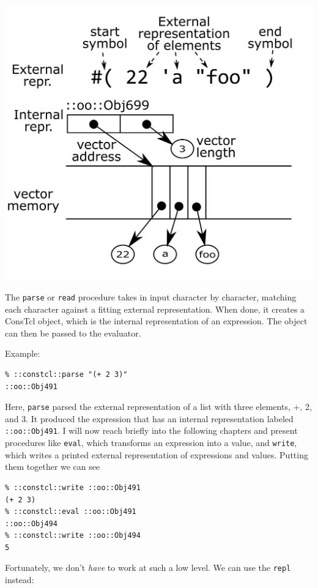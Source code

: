 \documentclass[a5paper,draft]{memoir}
\begin{document}
\includegraphics{images/vector-representation.png}

The \texttt{parse} or \texttt{read} procedure takes in input character by character, matching each character against a fitting external representation. When done, it creates a ConsTcl object, which is the internal representation of an expression. The object can then be passed to the evaluator.

Example:

\begin{verbatim}
% ::constcl::parse "(+ 2 3)"
::oo::Obj491
\end{verbatim}

Here, \texttt{parse} parsed the external representation of a list with three elements, +, 2, and 3. It produced the expression that has an internal representation labeled \texttt{::oo::Obj491}. I will now reach briefly into the following chapters and present procedures like \texttt{eval}, which transforms an expression into a value, and \texttt{write}, which writes a printed external representation of expressions and values. Putting them together we can see

\begin{verbatim}
% ::constcl::write ::oo::Obj491
(+ 2 3)
% ::constcl::eval ::oo::Obj491
::oo::Obj494
% ::constcl::write ::oo::Obj494
5
\end{verbatim}

Fortunately, we don't \emph{have} to work at such a low level. We can use the \texttt{repl} instead:
\end{document}
